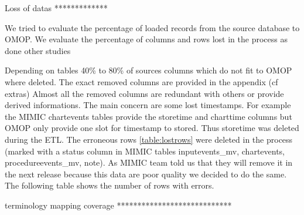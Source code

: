 Loss of datas
*************

We tried to evaluate the percentage of loaded records from the source database
to OMOP. We evaluate the percentage of columns and rows lost in the process as
done other studies \cite{omop-nashville}

Depending on tables 40\% to 80\% of sources columns which do not fit to OMOP
where deleted.  The exact removed columns are provided in the appendix (cf
extras) Almost all the removed columns are redundant with others or provide
derived informations.  The main concern are some lost timestamps. For example
the MIMIC chartevents tables provide the storetime and charttime columns but
OMOP only provide one slot for timestamp to stored. Thus storetime was deleted
during the ETL.
The erroneous rows \ref{table:lostrows} were deleted in the process (marked
with a status column in MIMIC tables inputevents\_mv, chartevents,
procedureevents\_mv, note). As MIMIC team told us that they will remove it in
the next release because this data are poor quality we decided to do the same. 
The following table shows the number of rows with errors.

\begin{table*}[t]
\label{table:lostrows}
\end{table*}

terminology mapping coverage
****************************

